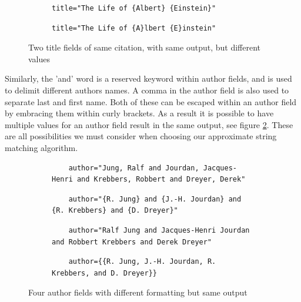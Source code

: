 \documentclass[a4paper,11pt]{article}
\begin{document}
\begin{figure}[H]
\centering
\begin{subfigure}{.5\textwidth}
  \begin{verbatim}
title="The Life of {Albert} {Einstein}"
\end{verbatim}
\end{subfigure}%
\begin{subfigure}{.5\textwidth}
  \begin{verbatim}
title="The Life of {A}lbert {E}instein"
\end{verbatim}
\end{subfigure}
\caption{Two title fields of same citation, with same output, but different values}
\label{fig:differentButSameTitles}
\end{figure}

Similarly, the 'and' word is a reserved keyword within author fields, and is used to delimit different authors names. A comma in the author field is also used to separate last and first name. Both of these can be escaped within an author field by embracing them within curly brackets. As a result it is possible to have multiple values for an author field result in the same output, see figure \ref{fig:differentButSameAuthors}. These are all possibilities we must consider when choosing our approximate string matching algorithm.

\begin{figure}[H]
\begin{subfigure}{\textwidth}
    \begin{verbatim}
    author="Jung, Ralf and Jourdan, Jacques-Henri and Krebbers, Robbert and Dreyer, Derek"
    \end{verbatim}
\end{subfigure}
\begin{subfigure}{\textwidth}
    \begin{verbatim}
    author="{R. Jung} and {J.-H. Jourdan} and {R. Krebbers} and {D. Dreyer}"
    \end{verbatim}
\end{subfigure}
\begin{subfigure}{\textwidth}
    \begin{verbatim}
    author="Ralf Jung and Jacques-Henri Jourdan and Robbert Krebbers and Derek Dreyer"
    \end{verbatim}
 \end{subfigure}  
 \begin{subfigure}{\textwidth}
    \begin{verbatim}
    author={{R. Jung, J.-H. Jourdan, R. Krebbers, and D. Dreyer}}
    \end{verbatim}
 \end{subfigure}   
 \caption{Four author fields with different formatting but same output}
\label{fig:differentButSameAuthors}
\end{figure}
\end{document}
